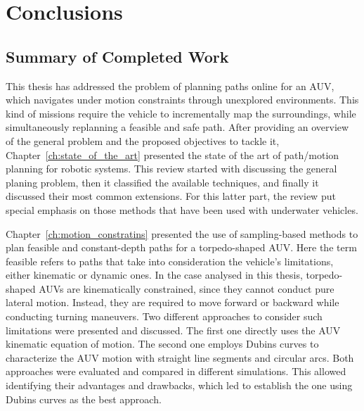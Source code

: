 
\chapter{Conclusions}\label{ch:conclusions} %



\ifpdf
    \graphicspath{{7_conclusions/figures/PNG/}{7_conclusions/figures/PDF/}{7_conclusions/figures/}}
\else
    \graphicspath{{7_conclusions/figures/EPS/}{7_conclusions/figures/}}
\fi




\section{Summary of Completed Work}

This thesis has addressed the problem of planning paths online for an \acf{AUV},
which navigates under motion constraints through unexplored environments. This
kind of missions require the vehicle to incrementally map the surroundings,
while simultaneously replanning a feasible and safe path. After providing an
overview of the general problem and the proposed objectives to tackle it,
Chapter~\ref{ch:state_of_the_art} presented the state of the art of path/motion
planning for robotic systems. This review started with discussing the general
planing problem, then it classified the available techniques, and finally it
discussed their most common extensions. For this latter part, the review put
special emphasis on those methods that have been used with underwater vehicles.

Chapter~\ref{ch:motion_constratins} presented the use of sampling-based methods
to plan feasible and constant-depth paths for a torpedo-shaped \ac{AUV}.
Here the term feasible refers to paths that take into consideration the
vehicle's limitations, either kinematic or dynamic ones. In the case analysed in
this thesis, torpedo-shaped \acp{AUV} are kinematically constrained, since they
cannot conduct pure lateral motion. Instead, they are required to move forward
or backward while conducting turning maneuvers. Two different approaches to
consider such limitations were presented and discussed. The first one directly
uses the \ac{AUV} kinematic equation of motion. The second one employs Dubins
curves to characterize the \ac{AUV} motion with straight line segments and
circular arcs. Both approaches were evaluated and compared in different
simulations. This allowed identifying their advantages and drawbacks, which led
to establish the one using Dubins curves as the best approach.

